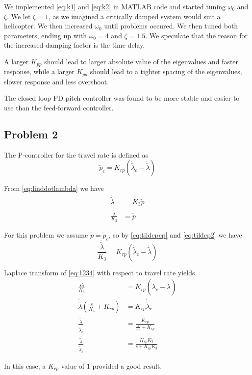 We implemented \cref{eq:k1} and \cref{eq:k2} in MATLAB code and started tuning $\omega_0$ and $\zeta$. We let $\zeta=1$, as we imagined a critically damped system would suit a helicopter. We then increased $\omega_0$ until problems occured. We then tuned both parameters, ending up with $\omega_0 = 4$ and $\zeta=1.5$. We speculate that the reason for the increased damping factor is the time delay.

A larger $K_{pp}$ should lead to larger absolute value of the eigenvalues and faster response, while a larger $K_{pd}$ should lead to a tighter spacing of the eigenvalues, slower response and less overshoot.

The closed loop PD pitch controller was found to be more stable and easier to use than the feed-forward controller.

\subsection{Problem 2}

The P-controller for the travel rate is defined as
\begin{equation}
	\tilde p_c = K_{rp}(\dot{\tilde{\lambda}}_c - \dot{\tilde{\lambda}}) \label{eq:tildepcp}
\end{equation}

From \cref{eq:linddotlambda} we have
\begin{subequations}
		\begin{align}
		\ddot{\tilde \lambda} &= K_3 \tilde p \\
		\frac{\ddot{\tilde \lambda}}{K_3} &= \tilde p
		\end{align}
		\label{eq:tildep2}
\end{subequations}

For this problem we assume $ \tilde p = \tilde p_c$, so by \cref{eq:tildepcp} and \cref{eq:tildep2} we have 
\begin{equation}
	\frac{\ddot{\tilde \lambda}}{K_3} = K_{rp}(\dot{\tilde{\lambda}}_c - \dot{\tilde{\lambda}}) \label{eq:1234}
\end{equation}

Laplace transform of \cref{eq:1234} with respect to travel rate yields
\begin{subequations}
		\begin{align}
		\frac{s \dot{\tilde \lambda}}{K_3} &= K_{rp}(\dot{\tilde{\lambda}}_c - \dot{\tilde{\lambda}}) \\
		\dot{\tilde \lambda}(\frac{s}{K_3} + K_{rp}) &= K_{rp}\dot{\tilde{\lambda}}_c \\
		\frac{\dot{\tilde{\lambda}}}{\dot{\tilde{\lambda}}_c} &= \frac{K_{rp}}{\frac{s}{K_3} + K_{rp}} \\
		\frac{\dot{\tilde{\lambda}}}{\dot{\tilde{\lambda}}_c} &= \frac{K_{rp} K_3}{s + K_{rp} K_3}
		\end{align}
\end{subequations}

In this case, a $K_{rp}$ value of $1$ provided a good result. 